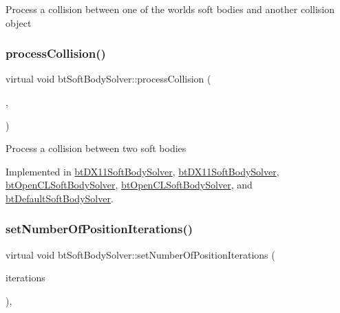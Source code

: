 Process a collision between one of the world\textquotesingle{}s soft bodies and another collision object \mbox{\label{classbtSoftBodySolver_a08f03a574f0936d834ff100f87755ea6}} 
\subsubsection{\texorpdfstring{process\+Collision()}{processCollision()}\hspace{0.1cm}{\footnotesize\ttfamily [2/2]}}
{\footnotesize\ttfamily virtual void bt\+Soft\+Body\+Solver\+::process\+Collision (\begin{DoxyParamCaption}\item[{\hyperlink{classbtSoftBody}{bt\+Soft\+Body} $\ast$}]{,  }\item[{\hyperlink{classbtSoftBody}{bt\+Soft\+Body} $\ast$}]{ }\end{DoxyParamCaption})\hspace{0.3cm}{\ttfamily [pure virtual]}}

Process a collision between two soft bodies 

Implemented in \hyperlink{classbtDX11SoftBodySolver_a74adb4cab44b9058b9d67b7b8116d30e}{bt\+D\+X11\+Soft\+Body\+Solver}, \hyperlink{classbtDX11SoftBodySolver_af49d469304c58ed901182915915aee64}{bt\+D\+X11\+Soft\+Body\+Solver}, \hyperlink{classbtOpenCLSoftBodySolver_a79c0fb52b0e405fec3ea991e2bf8ec29}{bt\+Open\+C\+L\+Soft\+Body\+Solver}, \hyperlink{classbtOpenCLSoftBodySolver_abab8bf075930d09ce71458e2cab33c93}{bt\+Open\+C\+L\+Soft\+Body\+Solver}, and \hyperlink{classbtDefaultSoftBodySolver_a537aa8ae1601bbafb87ebaf10f5e4e31}{bt\+Default\+Soft\+Body\+Solver}.

\mbox{\label{classbtSoftBodySolver_a80ffccfd244c51b2843991989a4191c9}} 
\subsubsection{\texorpdfstring{set\+Number\+Of\+Position\+Iterations()}{setNumberOfPositionIterations()}}
{\footnotesize\ttfamily virtual void bt\+Soft\+Body\+Solver\+::set\+Number\+Of\+Position\+Iterations (\begin{DoxyParamCaption}\item[{int}]{iterations }\end{DoxyParamCaption})\hspace{0.3cm}{\ttfamily [inline]}, {\ttfamily [virtual]}}

